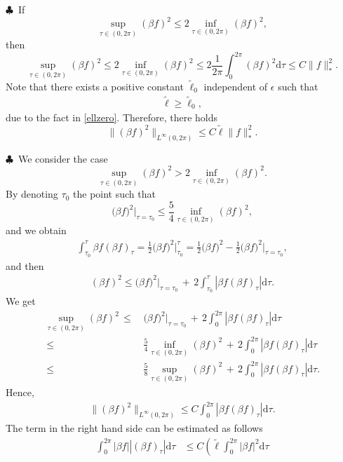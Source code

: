 \documentclass[10pt, reqno]{amsart}
\numberwithin{equation}{section}
\theoremstyle{definition}
\begin{document}
{{\smallskip
\noindent $\clubsuit$\
If
$$
\sup_{\tau\in (0, 2\pi)}(\beta f)^2\leq 2\inf_{\tau\in (0, 2\pi)}(\beta f)^2,
$$
then
$$
\sup_{\tau\in (0, 2\pi)}(\beta f)^2
\leq
2\inf_{\tau\in (0, 2\pi)}(\beta f)^2
\leq
2\frac{1}{2\pi}\int_0^{2\pi}(\beta f)^2{\mathrm d}\tau
\leq C\|f\|_*^2.
$$
Note that there exists a positive constant ${\tilde\ell}_0$ independent of $\epsilon$ such that
\begin{align*}
 {\tilde\ell}\geq {\tilde\ell}_0,
\end{align*}
due to the fact in \eqref{ellzero}.
Therefore, there holds
$$
\|(\beta f)^2\|_{L^{\infty}(0, 2\pi)}
\leq C{\tilde\ell}\|f\|_*^2.
$$

\smallskip
\noindent $\clubsuit$\
We consider the case
$$
\sup_{\tau\in (0, 2\pi)}(\beta f)^2> 2\inf_{\tau\in (0, 2\pi)}(\beta f)^2.
$$
By denoting $\tau_0$ the  point  such that
\begin{equation*}
\big(\beta f\big)^2 \Big|_{\tau=\tau_0}\leq \frac{5}{4}\inf_{\tau\in (0, 2\pi)}(\beta f)^2,
\end{equation*}
and we obtain
\begin{align*}
\int^\tau_{\tau_0} \beta f (\beta f)_\tau
=\frac{1}{2}\big(\beta f\big)^2\Big|^\tau_{\tau_0}
=\frac{1}{2}\big(\beta f\big)^2-\frac{1}{2}\big(\beta f\big)^2\Big|_{\tau=\tau_0},
\end{align*}
and then
\begin{align*}
(\beta f)^2
\leq
\big(\beta f\big)^2\Big|_{\tau=\tau_0}
\,+\,2\int^\tau_{\tau_0} |\beta f (\beta f)_\tau|{\mathrm d}\tau.
\end{align*}
We get
\begin{align*}
\sup_{\tau\in (0, 2\pi)} (\beta f)^2
\,\leq\,&
\big(\beta f\big)^2\Big|_{\tau=\tau_0}
\,+\,2\int^{2\pi}_0 |\beta f (\beta f)_\tau|{\mathrm d}\tau
\\[2mm]
\,\leq\,&
\frac{5}{4}\inf_{\tau\in (0, 2\pi)}(\beta f)^2
\,+\,2\int^{2\pi}_0 |\beta f (\beta f)_\tau|{\mathrm d}\tau
\\[2mm]
\,\leq\,&
\frac{5}{8}\sup_{\tau\in (0, 2\pi)}(\beta f)^2
\,+\,2\int^{2\pi}_0 |\beta f (\beta f)_\tau|{\mathrm d}\tau.
\end{align*}
Hence,
\begin{align*}
\|(\beta f)^2\|_{L^{\infty}(0, 2\pi)}
\leq
C\int^{2\pi}_0 |\beta f (\beta f)_\tau|{\mathrm d}\tau.
\end{align*}
The term in the right hand side can be estimated as follows
\begin{align*}
\int_0^{2\pi} |\beta f| |(\beta f)_\tau|{\mathrm d}\tau
&\le C \left(\tilde\ell \int_0^{2\pi} |\beta f|^2{\mathrm d}\tau

\end{align*}}}
\end{document}
